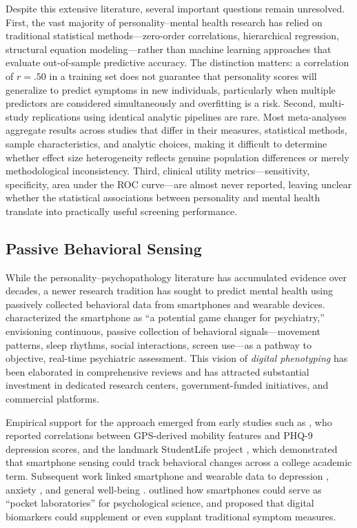 \documentclass[12pt, a4paper]{article}
\begin{document}
Despite this extensive literature, several important questions remain unresolved. First, the vast majority of personality--mental health research has relied on traditional statistical methods---zero-order correlations, hierarchical regression, structural equation modeling---rather than machine learning approaches that evaluate out-of-sample predictive accuracy. The distinction matters: a correlation of $r = .50$ in a training set does not guarantee that personality scores will generalize to predict symptoms in new individuals, particularly when multiple predictors are considered simultaneously and overfitting is a risk. Second, multi-study replications using identical analytic pipelines are rare. Most meta-analyses aggregate results across studies that differ in their measures, statistical methods, sample characteristics, and analytic choices, making it difficult to determine whether effect size heterogeneity reflects genuine population differences or merely methodological inconsistency. Third, clinical utility metrics---sensitivity, specificity, area under the ROC curve---are almost never reported, leaving unclear whether the statistical associations between personality and mental health translate into practically useful screening performance.

\subsection{Passive Behavioral Sensing}

While the personality--psychopathology literature has accumulated evidence over decades, a newer research tradition has sought to predict mental health using passively collected behavioral data from smartphones and wearable devices. \citet{insel2018digital} characterized the smartphone as ``a potential game changer for psychiatry,'' envisioning continuous, passive collection of behavioral signals---movement patterns, sleep rhythms, social interactions, screen use---as a pathway to objective, real-time psychiatric assessment. This vision of \textit{digital phenotyping} has been elaborated in comprehensive reviews \citep{torous2021growing, onnela2016harnessing, mohr2017personal} and has attracted substantial investment in dedicated research centers, government-funded initiatives, and commercial platforms.

Empirical support for the approach emerged from early studies such as \citet{saeb2015mobile}, who reported correlations between GPS-derived mobility features and PHQ-9 depression scores, and the landmark StudentLife project \citep{wang2014studentlife}, which demonstrated that smartphone sensing could track behavioral changes across a college academic term. Subsequent work linked smartphone and wearable data to depression \citep{chikersal2021detecting, wang2018sensing}, anxiety \citep{sano2018identifying}, and general well-being \citep{ben2015next}. \citet{harari2016using} outlined how smartphones could serve as ``pocket laboratories'' for psychological science, and \citet{jacobson2019digital} proposed that digital biomarkers could supplement or even supplant traditional symptom measures.
\end{document}
